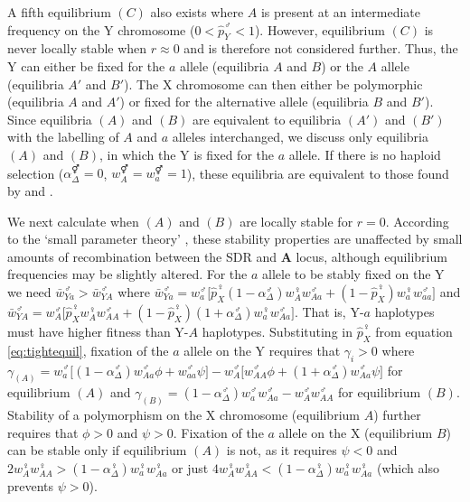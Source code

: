 \documentclass[12pt]{article}
\begin{document}
\noindent
A fifth equilibrium $(C)$ also exists where $A$ is present at an intermediate frequency on the Y chromosome ($0<\hat{p}_{Y}^{\male}<1$). However, equilibrium $(C)$ is never locally stable when $r \approx 0$ and is therefore not considered further. 
Thus, the Y can either be fixed for the $a$ allele (equilibria $A$ and $B$) or the $A$ allele (equilibria $A'$ and $B'$).
The X chromosome can then either be polymorphic (equilibria $A$ and $A'$) or fixed for the alternative allele (equilibria $B$ and $B'$).
Since equilibria $(A)$ and $(B)$ are equivalent to equilibria $(A')$ and $(B')$ with the labelling of $A$ and $a$ alleles interchanged, we discuss only equilibria $(A)$ and $(B)$, in which the Y is fixed for the $a$ allele. 
If there is no haploid selection ($\alpha^{\Hermaphrodite}_\Delta=0$, $w_{A}^{\Hermaphrodite}=w_{a}^{\Hermaphrodite}=1$), these equilibria are equivalent to those found by \cite{Lloyd1977} and \cite{Otto2014}.

We next calculate when $(A)$ and $(B)$ are locally stable for $r=0$. 
According to the `small parameter theory' \citep{Karlin:1972ab,Karlin:1972dq}, these stability properties are unaffected by small amounts of recombination between the SDR and \textbf{A} locus, although equilibrium frequencies may be slightly altered. 
For the $a$ allele to be stably fixed on the Y we need $\bar{w}_{Ya}^{\male} > \bar{w}_{YA}^{\male}$ where $\bar{w}_{Ya}^{\male} = w_{a}^{\male} \big[\hat{p}_X^\female(1-\alpha^\male_\Delta) w_{A}^{\female} w_{Aa}^{\male} + (1-\hat{p}_X^\female)w_{a}^{\female} w_{aa}^{\male} \big]$ and $\bar{w}_{YA}^{\male} = w_{A}^{\male} \big[ \hat{p}_X^\female w_{A}^{\female} w_{AA}^{\male} + (1-\hat{p}_X^\female)(1+\alpha^\male_\Delta) w_{a}^{\female} w_{Aa}^{\male} \big]$. 
That is, Y-$a$ haplotypes must have higher fitness than Y-$A$ haplotypes.  
Substituting in $\hat{p}_X^\female$ from equation \eqref{eq:tightequil}, fixation of the $a$ allele on the Y requires that $\gamma_{i}>0$ where $\gamma_{(A)}=w_{a}^{\male} \big[ (1-\alpha^\male_\Delta) w_{Aa}^{\male} \phi + w_{aa}^{\male} \psi \big]-w_{A}^{\male} \big[ w_{AA}^{\male} \phi + (1 + \alpha^{\male}_\Delta)w_{Aa}^{\male} \psi \big]$ for equilibrium $(A)$ and $\gamma_{(B)}=(1-\alpha^{\male}_\Delta)w_{a}^{\male}w_{Aa}^{\male}-w_{A}^{\male}w_{AA}^{\male}$ for equilibrium $(B)$.
Stability of a polymorphism on the X chromosome (equilibrium $A$) further requires that $\phi >0$ and $\psi >0$. 
Fixation of the $a$ allele on the X (equilibrium $B$) can be stable only if equilibrium $(A)$ is not, as it requires $\psi<0$ and $2w_{A}^{\female}w_{AA}^{\female}>(1-\alpha_\Delta^{\female})w_{a}^{\female}w_{Aa}^{\female}$ or just $4w_{A}^{\female}w_{AA}^{\female}<(1-\alpha_\Delta^{\female})w_{a}^{\female}w_{Aa}^{\female}$ (which also prevents $\psi>0$). 
\end{document}
